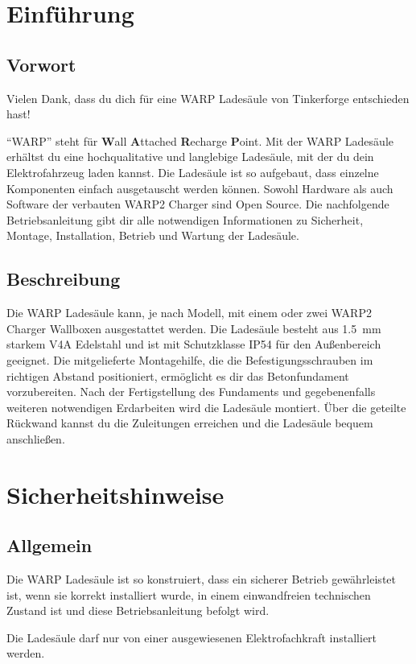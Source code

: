 \documentclass[a4paper,10pt]{article}
\newcommand{\hint}[1]{\begin{tcolorbox}[colback=boxgray,colframe=black,coltext=
white,title=Hinweis]#1\end{tcolorbox}}
\begin{document}
\begin{multicols*}{2}
	\tableofcontents \section{Einführung}
	\subsection{Vorwort} Vielen Dank, dass du
	dich für eine WARP Ladesäule von Tinkerforge entschieden hast!

	\enquote{WARP} steht
	für \textbf{W}all \textbf{A}ttached
	\textbf{R}echarge \textbf{P}oint. Mit der WARP Ladesäule
	erhältst du eine hochqualitative und langlebige Ladesäule, mit der du dein
	Elektrofahrzeug laden kannst. Die Ladesäule ist so aufgebaut, dass
	einzelne Komponenten einfach ausgetauscht werden können. Sowohl Hardware als
	auch Software der verbauten WARP2 Charger sind Open Source. Die nachfolgende Betriebsanleitung gibt dir	alle notwendigen Informationen zu Sicherheit, Montage, Installation, Betrieb
	und Wartung der Ladesäule.

	\subsection{Beschreibung}

	Die WARP Ladesäule kann, je nach Modell, mit einem oder zwei WARP2 Charger Wallboxen
	ausgestattet werden. Die Ladesäule besteht aus
	\SI{1.5}{\milli\meter} starkem V4A Edelstahl und ist mit Schutzklasse IP54 für den
	Außenbereich geeignet. Die mitgelieferte Montagehilfe, die die Befestigungsschrauben im
	richtigen Abstand positioniert, ermöglicht es dir das Betonfundament
	vorzubereiten.
	Nach der Fertigstellung des Fundaments und gegebenenfalls weiteren
	notwendigen Erdarbeiten wird die Ladesäule montiert.
	Über die geteilte Rückwand kannst du
	die Zuleitungen erreichen und die Ladesäule bequem anschließen. 
\vspace{-0.2cm}
	\section{Sicherheitshinweise}
\vspace{-0.2cm}
	\subsection{Allgemein}
	Die WARP Ladesäule ist so konstruiert, dass ein sicherer Betrieb gewährleistet ist,
	wenn sie korrekt installiert wurde, in einem einwandfreien technischen Zustand
	ist und diese Betriebsanleitung befolgt wird. \hint{Die Ladesäule darf nur von einer ausgewiesenen Elektrofachkraft installiert
		werden.}
\vspace{-0.2cm}

\end{multicols*}
\end{document}
